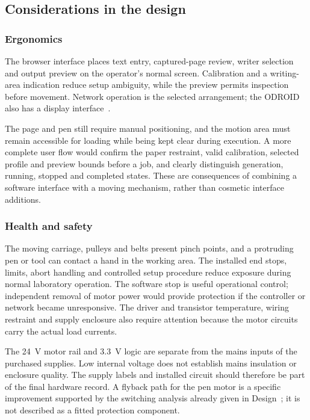 \subsection{Considerations in the design}
\label{sec:dis-considerations}
\subsubsection{Ergonomics}
The browser interface places text entry, captured-page review, writer selection and output preview on the operator's normal screen. Calibration and a writing-area indication reduce setup ambiguity, while the preview permits inspection before movement. Network operation is the selected arrangement; the ODROID also has a display interface~\cite[``External I/O'' section, unpaginated]{odroidn2ds}.

The page and pen still require manual positioning, and the motion area must remain accessible for loading while being kept clear during execution. A more complete user flow would confirm the paper restraint, valid calibration, selected profile and preview bounds before a job, and clearly distinguish generation, running, stopped and completed states. These are consequences of combining a software interface with a moving mechanism, rather than cosmetic interface additions.

\subsubsection{Health and safety}
The moving carriage, pulleys and belts present pinch points, and a protruding pen or tool can contact a hand in the working area. The installed end stops, limits, abort handling and controlled setup procedure reduce exposure during normal laboratory operation. The software stop is useful operational control; independent removal of motor power would provide protection if the controller or network became unresponsive. The driver and transistor temperature, wiring restraint and supply enclosure also require attention because the motor circuits carry the actual load currents.

The 24~V motor rail and 3.3~V logic are separate from the mains inputs of the purchased supplies. Low internal voltage does not establish mains insulation or enclosure quality. The supply labels and installed circuit should therefore be part of the final hardware record. A flyback path for the pen motor is a specific improvement supported by the switching analysis already given in Design~\cite[``Protection and Wiring Techniques'' section, unpaginated]{rohmlowside2026}; it is not described as a fitted protection component.

